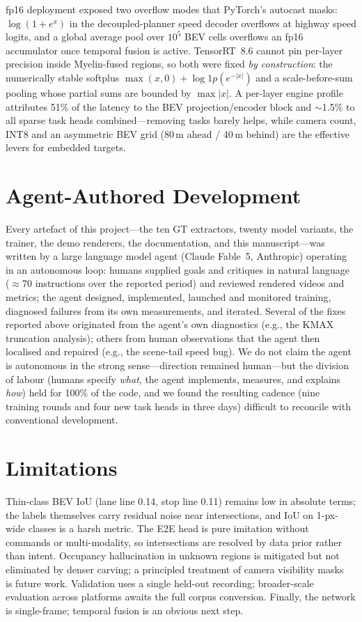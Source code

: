 \documentclass[10pt,twocolumn]{article}
\newcommand{\eg}{e.g.,}
\begin{document}
fp16 deployment exposed two overflow modes that PyTorch's autocast masks:
$\log(1{+}e^{x})$ in the decoupled-planner speed decoder overflows at
highway speed logits, and a global average pool over $10^{5}$ BEV cells
overflows an fp16 accumulator once temporal fusion is active. TensorRT~8.6
cannot pin per-layer precision inside Myelin-fused regions, so both were
fixed \emph{by construction}: the numerically stable softplus
$\max(x,0){+}\log1p(e^{-|x|})$ and a scale-before-sum pooling whose partial
sums are bounded by $\max|x|$. A per-layer engine profile attributes 51\%
of the latency to the BEV projection/encoder block and $\sim$1.5\% to all
sparse task heads combined---removing tasks barely helps, while camera
count, INT8 and an asymmetric BEV grid (80\,m ahead / 40\,m behind) are the
effective levers for embedded targets.

\section{Agent-Authored Development}
\label{sec:agent}
Every artefact of this project---the ten GT extractors, twenty model
variants, the trainer, the demo renderers, the documentation, and this
manuscript---was written by a large language model agent (Claude Fable~5,
Anthropic) operating in an autonomous loop: humans supplied goals and
critiques in natural language ($\approx$70 instructions over the reported
period) and reviewed rendered videos and metrics; the agent designed,
implemented, launched and monitored training, diagnosed failures from its own
measurements, and iterated. Several of the fixes reported above originated
from the agent's own diagnostics (\eg{} the KMAX truncation analysis); others
from human observations that the agent then localised and repaired (\eg{} the
scene-tail speed bug). We do not claim the agent is autonomous in the strong
sense---direction remained human---but the division of labour (humans specify
\emph{what}, the agent implements, measures, and explains \emph{how}) held
for 100\% of the code, and we found the resulting cadence (nine training
rounds and four new task heads in three days) difficult to reconcile with
conventional development.

\section{Limitations}
Thin-class BEV IoU (lane line 0.14, stop line 0.11) remains low in absolute
terms; the labels themselves carry residual noise near intersections, and
IoU on 1-px-wide classes is a harsh metric. The E2E head is pure imitation
without commands or multi-modality, so intersections are resolved by
data prior rather than intent. Occupancy hallucination in unknown regions is
mitigated but not eliminated by denser carving; a principled treatment of
camera visibility masks~\citep{tian2023occ3d} is future work. Validation
uses a single held-out recording; broader-scale evaluation across platforms
awaits the full corpus conversion. Finally, the network is single-frame;
temporal fusion is an obvious next step.
\end{document}
